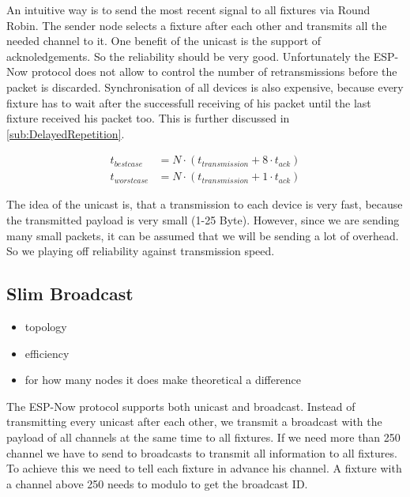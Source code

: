 \documentclass[]{ccs-thesis}
\begin{document}
An intuitive way is to send the most recent signal to all fixtures via Round Robin.
The sender node selects a fixture after each other and transmits all the needed channel to it.
One benefit of the unicast is the support of acknoledgements. So the reliability should be very good. 
Unfortunately the ESP-Now protocol does not allow to control the number of retransmissions before the packet is discarded.
Synchronisation of all devices is also expensive, because every fixture has to wait after the successfull receiving of his packet until the last fixture received his packet too.
This is further discussed in \cref{sub:DelayedRepetition}.

\begin{align*} \label{eq:transmission_unicast}
	t_{bestcase}  &= N \cdot (t_{transmission} + 8 \cdot t_{ack}) \\
	t_{worstcase} &= N \cdot (t_{transmission} + 1 \cdot t_{ack})
\end{align*} 

The idea of the unicast is, that a transmission to each device is very fast, because the transmitted payload is very small (1-25 Byte).
However, since we are sending many small packets, it can be assumed that we will be sending a lot of overhead.
So we playing off reliability against transmission speed.


\subsection{Slim Broadcast}
\begin{itemize}
	\item topology
	\item efficiency
	\item for how many nodes it does make theoretical a difference
\end{itemize}

The ESP-Now protocol supports both unicast and broadcast.
Instead of transmitting every unicast after each other, we transmit a broadcast with the payload of all channels at the same time to all fixtures.
If we need more than 250 channel we have to send to broadcasts to transmit all information to all fixtures.
To achieve this we need to tell each fixture in advance his channel.
A fixture with a channel above 250 needs to modulo to get the broadcast ID.
\end{document}
